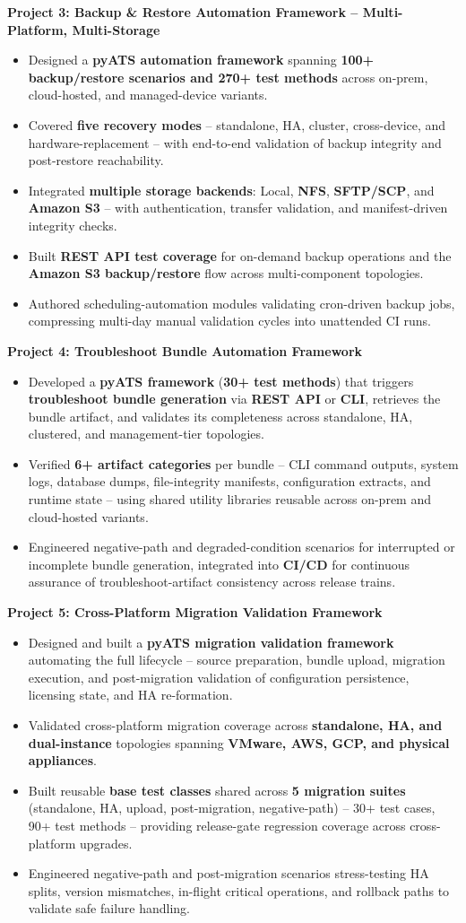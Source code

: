 \documentclass[letterpaper,11pt]{article}
\newcommand{\resumeItem}[1]{
  \item\small{
    {#1 \vspace{-2pt}}
  }
}
\newcommand{\resumeItemListStart}{\begin{itemize}[topsep=2pt, partopsep=0pt, parsep=0pt, itemsep=1pt, leftmargin=0.15in]}
\newcommand{\resumeItemListEnd}{\end{itemize}\vspace{-5pt}}
\begin{document}
\textbf{Project 3: Backup \& Restore Automation Framework -- Multi-Platform, Multi-Storage}
\nopagebreak
\resumeItemListStart
  \resumeItem{Designed a \textbf{pyATS automation framework} spanning \textbf{100+ backup/restore scenarios and 270+ test methods} across on-prem, cloud-hosted, and managed-device variants.}
  \resumeItem{Covered \textbf{five recovery modes} -- standalone, HA, cluster, cross-device, and hardware-replacement -- with end-to-end validation of backup integrity and post-restore reachability.}
  \resumeItem{Integrated \textbf{multiple storage backends}: Local, \textbf{NFS}, \textbf{SFTP/SCP}, and \textbf{Amazon S3} -- with authentication, transfer validation, and manifest-driven integrity checks.}
  \resumeItem{Built \textbf{REST API test coverage} for on-demand backup operations and the \textbf{Amazon S3 backup/restore} flow across multi-component topologies.}
  \resumeItem{Authored scheduling-automation modules validating cron-driven backup jobs, compressing multi-day manual validation cycles into unattended CI runs.}
\resumeItemListEnd
\vspace{6pt}

\textbf{Project 4: Troubleshoot Bundle Automation Framework}
\nopagebreak
\resumeItemListStart
  \resumeItem{Developed a \textbf{pyATS framework} (\textbf{30+ test methods}) that triggers \textbf{troubleshoot bundle generation} via \textbf{REST API} or \textbf{CLI}, retrieves the bundle artifact, and validates its completeness across standalone, HA, clustered, and management-tier topologies.}
  \resumeItem{Verified \textbf{6+ artifact categories} per bundle -- CLI command outputs, system logs, database dumps, file-integrity manifests, configuration extracts, and runtime state -- using shared utility libraries reusable across on-prem and cloud-hosted variants.}
  \resumeItem{Engineered negative-path and degraded-condition scenarios for interrupted or incomplete bundle generation, integrated into \textbf{CI/CD} for continuous assurance of troubleshoot-artifact consistency across release trains.}
\resumeItemListEnd
\vspace{14pt}

\textbf{Project 5: Cross-Platform Migration Validation Framework}
\nopagebreak
\resumeItemListStart
  \resumeItem{Designed and built a \textbf{pyATS migration validation framework} automating the full lifecycle -- source preparation, bundle upload, migration execution, and post-migration validation of configuration persistence, licensing state, and HA re-formation.}
  \resumeItem{Validated cross-platform migration coverage across \textbf{standalone, HA, and dual-instance} topologies spanning \textbf{VMware, AWS, GCP, and physical appliances}.}
  \resumeItem{Built reusable \textbf{base test classes} shared across \textbf{5 migration suites} (standalone, HA, upload, post-migration, negative-path) -- 30+ test cases, 90+ test methods -- providing release-gate regression coverage across cross-platform upgrades.}
  \resumeItem{Engineered negative-path and post-migration scenarios stress-testing HA splits, version mismatches, in-flight critical operations, and rollback paths to validate safe failure handling.}
\resumeItemListEnd
\end{document}
